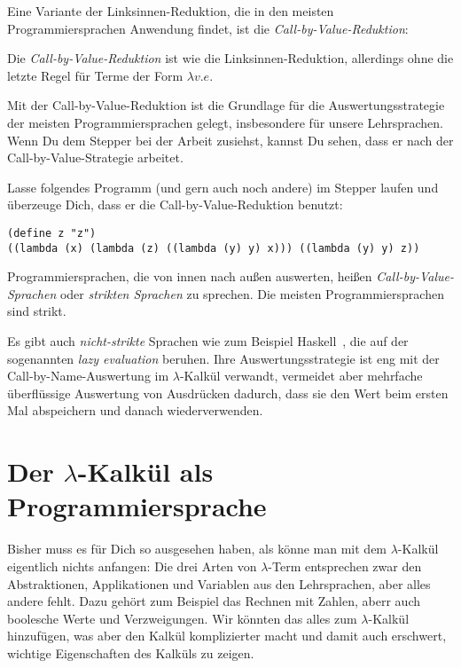 Eine Variante der Linksinnen-Reduktion, die in den meisten
Programmiersprachen Anwendung findet, ist die
\textit{Call-by-Value-Reduktion}:
%
\begin{definition}\label{def:call-by-value}
    Die \textit{Call-by-Value-Reduktion} ist wie die
  Linksinnen-Reduktion, allerdings ohne die letzte Regel für Terme der
  Form $\lambda v.e$.
\end{definition}
%
Mit der Call-by-Value-Reduktion ist die Grundlage für die
Auswertungsstrategie der meisten Programmiersprachen gelegt,
insbesondere für unsere Lehrsprachen.  Wenn Du dem Stepper bei der
Arbeit zusiehst, kannst Du sehen, dass er nach der
Call-by-Value-Strategie arbeitet.
%
\begin{aufgabeinline}
  Lasse folgendes Programm (und gern auch noch andere) im Stepper
  laufen und überzeuge Dich, dass er die Call-by-Value-Reduktion
  benutzt:
\begin{lstlisting}
(define z "z")
((lambda (x) (lambda (z) ((lambda (y) y) x))) ((lambda (y) y) z))
\end{lstlisting}
\end{aufgabeinline}
%
Programmiersprachen, die von innen nach außen auswerten, heißen
\textit{Call-by-Value-Sprachen} oder
\textit{strikten Sprachen} zu sprechen.
Die meisten Programmiersprachen sind strikt.

Es gibt auch \textit{nicht-strikte}
Sprachen wie zum Beispiel Haskell~\cite{Haskell2010},
die auf der sogenannten \textit{lazy evaluation} beruhen.  Ihre
Auswertungsstrategie ist eng mit der Call-by-Name-Auswertung im
$\lambda$-Kalkül verwandt, vermeidet
aber mehrfache überflüssige Auswertung von Ausdrücken dadurch, dass sie den
Wert beim ersten Mal abspeichern und danach wiederverwenden.

\section{Der $\lambda$-Kalkül als Programmiersprache}
\label{sec:lambdaprog}

Bisher muss es für Dich so ausgesehen haben, als könne man mit dem
$\lambda$-Kalkül eigentlich nichts anfangen: Die drei Arten von
$\lambda$-Term entsprechen zwar den Abstraktionen, Applikationen und
Variablen aus den Lehrsprachen, aber alles andere fehlt.  Dazu gehört
zum Beispiel das Rechnen mit Zahlen, aberr auch boolesche Werte und
Verzweigungen. Wir könnten das alles zum $\lambda$-Kalkül hinzufügen,
was aber den Kalkül komplizierter macht und damit auch erschwert,
wichtige Eigenschaften des Kalküls zu zeigen.

